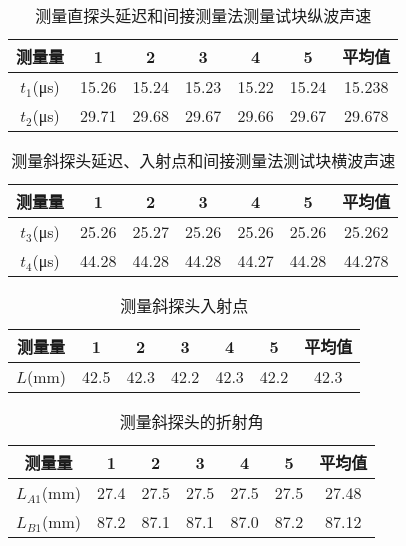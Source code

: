 \begin{table}[!ht]
    \caption{测量直探头延迟和间接测量法测量试块纵波声速}\label{tab:A7.exp2}
    \begin{tabularx}{\textwidth}{*{7}{C}} \toprule
        测量量 & 1 & 2 & 3 & 4 & 5 & 平均值 \\ \midrule
        $t_1$(\unit{\us}) & 15.26 & 15.24 & 15.23 & 15.22 & 15.24 & 15.238 \\ 
        $t_2$(\unit{\us}) & 29.71 & 29.68 & 29.67 & 29.66 & 29.67 & 29.678 \\ \bottomrule
    \end{tabularx}
\end{table}

\begin{table}[!ht]
    \caption{测量斜探头延迟、入射点和间接测量法测试块横波声速}\label{tab:A7.exp3}
    \begin{tabularx}{\textwidth}{*{7}{C}} \toprule
        测量量 & 1 & 2 & 3 & 4 & 5 & 平均值 \\ \midrule
        $t_3$(\unit{\us}) & 25.26 & 25.27 & 25.26 & 25.26 & 25.26 & 25.262 \\ 
        $t_4$(\unit{\us}) & 44.28 & 44.28 & 44.28 & 44.27 & 44.28 & 44.278 \\ \bottomrule
    \end{tabularx}
\end{table}

\begin{table}[!ht]
    \caption{测量斜探头入射点}\label{tab:A7.exp4}
    \begin{tabularx}{\textwidth}{*{7}{C}} \toprule
        测量量 & 1 & 2 & 3 & 4 & 5 & 平均值 \\ \midrule
        $L$(\unit{\mm}) & 42.5 & 42.3 & 42.2 & 42.3 & 42.2 & 42.3 \\ \bottomrule
    \end{tabularx}
\end{table}

\begin{table}[!ht]
    \caption{测量斜探头的折射角}\label{tab:A7.exp5}
    \begin{tabularx}{\textwidth}{*{7}{C}} \toprule
        测量量 & 1 & 2 & 3 & 4 & 5 & 平均值 \\ \midrule
        $L_{A1}$(\unit{\mm}) & 27.4 & 27.5 & 27.5 & 27.5 & 27.5 & 27.48 \\ 
        $L_{B1}$(\unit{\mm}) & 87.2 & 87.1 & 87.1 & 87.0 & 87.2 & 87.12 \\ \bottomrule
    \end{tabularx}
\end{table}

